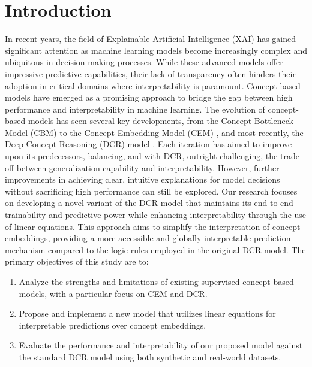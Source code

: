 \documentclass[sigconf, nonacm]{acmart}
\begin{document}
\keywords{}



\maketitle

\section{Introduction}
In recent years, the field of Explainable Artificial Intelligence (XAI) has gained significant attention as machine learning models become increasingly complex and ubiquitous in decision-making processes. While these advanced models offer impressive predictive capabilities, their lack of transparency often hinders their adoption in critical domains where interpretability is paramount. Concept-based models have emerged as a promising approach to bridge the gap between high performance and interpretability in machine learning.
The evolution of concept-based models has seen several key developments, from the Concept Bottleneck Model (CBM) \cite{koh2020concept} to the Concept Embedding Model (CEM) \cite{espinosa2022concept}, and most recently, the Deep Concept Reasoning (DCR) model \cite{barbiero2023interpretable}. Each iteration has aimed to improve upon its predecessors, balancing, and with DCR, outright challenging, the trade-off between generalization capability and interpretability. However, further improvements in achieving clear, intuitive explanations for model decisions without sacrificing high performance can still be explored.
Our research focuses on developing a novel variant of the DCR model that maintains its end-to-end trainability and predictive power while enhancing interpretability through the use of linear equations. This approach aims to simplify the interpretation of concept embeddings, providing a more accessible and globally interpretable prediction mechanism compared to the logic rules employed in the original DCR model.
The primary objectives of this study are to:

\begin{enumerate}
    \item Analyze the strengths and limitations of existing supervised concept-based models, with a particular focus on CEM and DCR.
    \item Propose and implement a new model that utilizes linear equations for interpretable predictions over concept embeddings.
    \item Evaluate the performance and interpretability of our proposed model against the standard DCR model using both synthetic and real-world datasets.
\end{enumerate}
\end{document}
